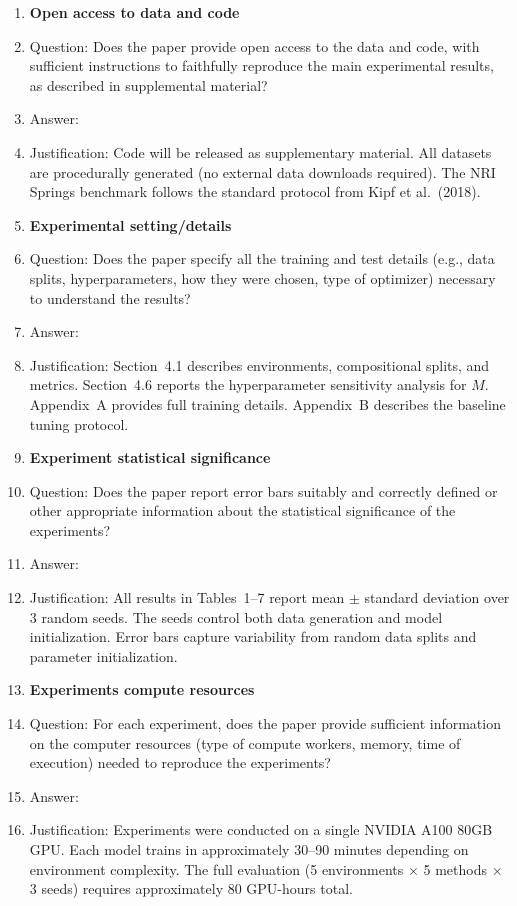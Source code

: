 \begin{enumerate}
\item {\bf Open access to data and code}
    \item[] Question: Does the paper provide open access to the data and code, with sufficient instructions to faithfully reproduce the main experimental results, as described in supplemental material?
    \item[] Answer: \answerYes{}
    \item[] Justification: Code will be released as supplementary material. All datasets are procedurally generated (no external data downloads required). The NRI Springs benchmark follows the standard protocol from Kipf et al.\ (2018).


\item {\bf Experimental setting/details}
    \item[] Question: Does the paper specify all the training and test details (e.g., data splits, hyperparameters, how they were chosen, type of optimizer) necessary to understand the results?
    \item[] Answer: \answerYes{}
    \item[] Justification: Section~4.1 describes environments, compositional splits, and metrics. Section~4.6 reports the hyperparameter sensitivity analysis for $M$. Appendix~A provides full training details. Appendix~B describes the baseline tuning protocol.

\item {\bf Experiment statistical significance}
    \item[] Question: Does the paper report error bars suitably and correctly defined or other appropriate information about the statistical significance of the experiments?
    \item[] Answer: \answerYes{}
    \item[] Justification: All results in Tables~1--7 report mean $\pm$ standard deviation over 3 random seeds. The seeds control both data generation and model initialization. Error bars capture variability from random data splits and parameter initialization.

\item {\bf Experiments compute resources}
    \item[] Question: For each experiment, does the paper provide sufficient information on the computer resources (type of compute workers, memory, time of execution) needed to reproduce the experiments?
    \item[] Answer: \answerYes{}
    \item[] Justification: Experiments were conducted on a single NVIDIA A100 80GB GPU. Each model trains in approximately 30--90 minutes depending on environment complexity. The full evaluation (5 environments $\times$ 5 methods $\times$ 3 seeds) requires approximately 80 GPU-hours total.


\end{enumerate}
